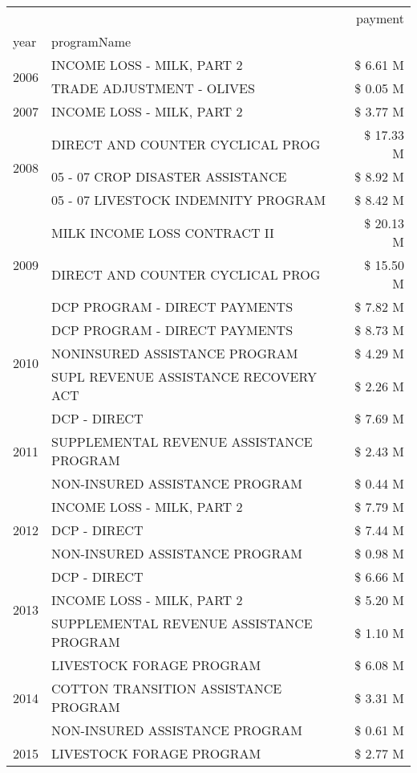 \begin{tabular}{llr}
\toprule
 &  & payment \\
year & programName &  \\
\midrule
\multirow[t]{2}{*}{2006} & INCOME LOSS - MILK, PART 2 & \$ 6.61 M \\
 & TRADE ADJUSTMENT - OLIVES & \$ 0.05 M \\
\cline{1-3}
2007 & INCOME LOSS - MILK, PART 2 & \$ 3.77 M \\
\cline{1-3}
\multirow[t]{3}{*}{2008} & DIRECT AND COUNTER CYCLICAL PROG & \$ 17.33 M \\
 & 05 - 07 CROP DISASTER ASSISTANCE & \$ 8.92 M \\
 & 05 - 07 LIVESTOCK INDEMNITY PROGRAM & \$ 8.42 M \\
\cline{1-3}
\multirow[t]{3}{*}{2009} & MILK INCOME LOSS CONTRACT II & \$ 20.13 M \\
 & DIRECT AND COUNTER CYCLICAL PROG & \$ 15.50 M \\
 & DCP PROGRAM - DIRECT PAYMENTS & \$ 7.82 M \\
\cline{1-3}
\multirow[t]{3}{*}{2010} & DCP PROGRAM - DIRECT PAYMENTS & \$ 8.73 M \\
 & NONINSURED ASSISTANCE PROGRAM & \$ 4.29 M \\
 & SUPL REVENUE ASSISTANCE RECOVERY ACT & \$ 2.26 M \\
\cline{1-3}
\multirow[t]{3}{*}{2011} & DCP - DIRECT & \$ 7.69 M \\
 & SUPPLEMENTAL REVENUE ASSISTANCE PROGRAM & \$ 2.43 M \\
 & NON-INSURED ASSISTANCE PROGRAM & \$ 0.44 M \\
\cline{1-3}
\multirow[t]{3}{*}{2012} & INCOME LOSS - MILK, PART 2 & \$ 7.79 M \\
 & DCP - DIRECT & \$ 7.44 M \\
 & NON-INSURED ASSISTANCE PROGRAM & \$ 0.98 M \\
\cline{1-3}
\multirow[t]{3}{*}{2013} & DCP - DIRECT & \$ 6.66 M \\
 & INCOME LOSS - MILK, PART 2 & \$ 5.20 M \\
 & SUPPLEMENTAL REVENUE ASSISTANCE PROGRAM & \$ 1.10 M \\
\cline{1-3}
\multirow[t]{3}{*}{2014} & LIVESTOCK FORAGE PROGRAM & \$ 6.08 M \\
 & COTTON TRANSITION ASSISTANCE PROGRAM & \$ 3.31 M \\
 & NON-INSURED ASSISTANCE PROGRAM & \$ 0.61 M \\
\cline{1-3}
\multirow[t]{3}{*}{2015} & LIVESTOCK FORAGE PROGRAM & \$ 2.77 M \\

\end{tabular}
